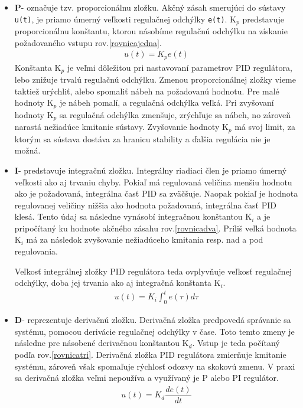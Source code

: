 \begin{itemize}
	\item \textbf{P}- označuje tzv. proporcionálnu zložku. Akčný zásah smerujúci do sústavy \verb|u(t)|, je priamo úmerný veľkosti regulačnej odchýlky \verb|e(t)|. K$_p$ predstavuje proporcionálnu konštantu, ktorou násobíme regulačnú odchýlku na získanie požadovaného vstupu rov.\ref{rovnicajedna}. 
	\begin{align}
		\label{rovnicajedna}
		u(t)=K_p e(t)
	\end{align}
	Konštanta K$_p$ je veľmi dôležitou pri nastavovaní parametrov PID regulátora, lebo znižuje trvalú regulačnú odchýlku. Zmenou proporcionálnej zložky vieme taktiež urýchliť, alebo spomaliť nábeh na požadovanú hodnotu. Pre malé hodnoty K$_p$ je nábeh pomalí, a regulačná odchýlka veľká. Pri zvyšovaní hodnoty K$_p$ sa regulačná odchýlka zmenšuje, zrýchľuje sa nábeh, no zároveň narastá nežiadúce kmitanie sústavy. Zvyšovanie hodnoty K$_p$ má svoj limit, za ktorým sa sústava dostáva za hranicu stability a ďalšia regulácia nie je možná. 
	
	\item \textbf{I}- predstavuje integračnú zložku. Integrálny riadiaci člen je priamo úmerný veľkosti ako aj trvaniu chyby. Pokiaľ má regulovaná veličina menšiu hodnotu ako je požadovaná, integrálna časť PID sa zväčšuje. Naopak pokiaľ je hodnota regulovanej veličiny nižšia ako hodnota požadovaná, integrálna časť PID klesá. Tento údaj sa následne vynásobí integračnou konštantou K$_i$ a je pripočítaný ku hodnote akčného zásahu rov.\ref{rovnicadva}. Príliš veľká hodnota K$_i$ má za následok zvyšovanie nežiadúceho kmitania resp. nad a pod regulovania. 
	
	Veľkosť integrálnej zložky PID regulátora teda ovplyvňuje veľkosť regulačnej odchýlky, doba jej trvania ako aj integračná konštanta K$_i$.
	\begin{align}
		\label{rovnicadva}
		u(t)=K_i  \int_{0}^{t} e(\tau)d\tau
	\end{align}

	\item \textbf{D}- reprezentuje derivačnú zložku. Derivačná zložka predpovedá správanie sa systému, pomocou derivácie regulačnej odchýlky v čase. Toto temto zmeny je následne pre násobené derivačnou konštantou K$_d$. Vstup je teda počítaný podľa rov.\ref{rovnicatri}. Derivačná zložka PID regulátora zmierňuje kmitanie systému, zároveň však spomaľuje rýchlosť odozvy na skokovú zmenu. V praxi sa derivačná zložka veľmi nepoužíva a využívaný je P alebo PI regulátor. 
	\begin{align}
		\label{rovnicatri}
		u(t)=K_d  \dfrac{de(t)}{dt}
	\end{align}
\end{itemize}

